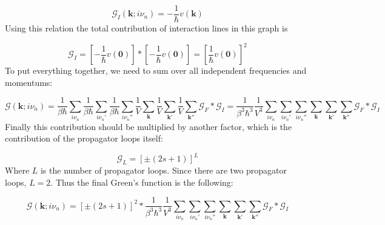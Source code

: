 \begin{equation} \label{eq:43}
\mathcal{G}_{I} \left( \boldsymbol{k}; i \nu_{n} \right)
=
- \frac{1}{\hbar} v \left( \boldsymbol{k} \right)
\end{equation}
Using this relation the total contribution of interaction lines in this graph is

\begin{equation} \label{eq:44}
\mathcal{G}_{I}
=
\left[ - \frac{1}{\hbar} v \left( \boldsymbol{0} \right) \right]
*
\left[ - \frac{1}{\hbar} v \left( \boldsymbol{0} \right) \right]
=
\left[ \frac{1}{\hbar} v \left( \boldsymbol{0} \right) \right]^{2}
\end{equation}
To put everything together, we need to sum over all independent frequencies and momentums:

\begin{equation} \label{eq:45}
\mathcal{G} \left( \boldsymbol{k}; i \nu_{n} \right)
=
\frac{1}{\beta \hbar} \sum_{i \nu_{n}}
\frac{1}{\beta \hbar} \sum_{i \nu_{n}'}
\frac{1}{\beta \hbar} \sum_{i \nu_{n}''}
\frac{1}{V} \sum_{\boldsymbol{k}}
\frac{1}{V} \sum_{\boldsymbol{k}'}
\frac{1}{V} \sum_{\boldsymbol{k}''}
\mathcal{G}_{F} * \mathcal{G}_{I}
=
\frac{1}{\beta^{3} \hbar^{3}} \frac{1}{V^{3}}
\sum_{i \nu_{n}}
\sum_{i \nu_{n}'}
\sum_{i \nu_{n}''}
\sum_{\boldsymbol{k}}
\sum_{\boldsymbol{k}'}
\sum_{\boldsymbol{k}''}
\mathcal{G}_{F} * \mathcal{G}_{I}
\end{equation}
Finally this contribution should be multiplied by another factor, which is the contribution of the propagator loops itself:

\begin{equation} \label{eq:46}
\mathcal{G}_{L}
=
\left[ \pm \left( 2s + 1 \right) \right]^{L}
\end{equation}
Where $L$ is the number of propagator loops. Since there are two propagator loops, $L = 2$. Thus the final Green's function is the following:

\begin{equation} \label{eq:47}
\mathcal{G} \left( \boldsymbol{k}; i \nu_{n} \right)
=
\left[ \pm \left( 2s + 1 \right) \right]^{2} *
\frac{1}{\beta^{3} \hbar^{3}} \frac{1}{V^{3}}
\sum_{i \nu_{n}}
\sum_{i \nu_{n}'}
\sum_{i \nu_{n}''}
\sum_{\boldsymbol{k}}
\sum_{\boldsymbol{k}'}
\sum_{\boldsymbol{k}''}
\mathcal{G}_{F} * \mathcal{G}_{I}
\end{equation}